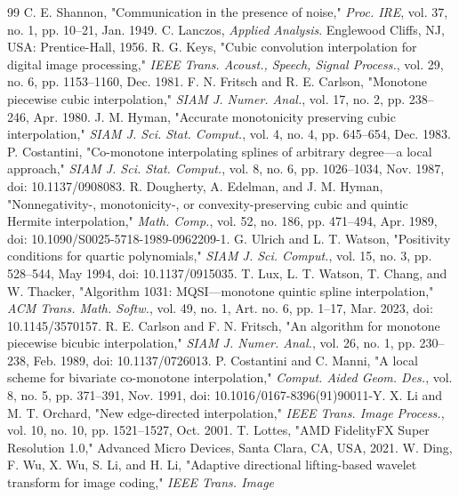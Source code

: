 \documentclass[journal]{IEEEtran}
\begin{document}
\begin{thebibliography}{99}
\scriptsize
{}
C. E. Shannon, "Communication in the presence of noise," \emph{Proc. IRE},
vol. 37, no. 1, pp. 10--21, Jan. 1949.
C. Lanczos, \emph{Applied Analysis}. Englewood Cliffs, NJ, USA:
Prentice-Hall, 1956.
R. G. Keys, "Cubic convolution interpolation for digital image
processing," \emph{IEEE Trans. Acoust., Speech, Signal Process.}, vol. 29,
no. 6, pp. 1153--1160, Dec. 1981.
F. N. Fritsch and R. E. Carlson, "Monotone piecewise cubic interpolation,"
\emph{SIAM J. Numer. Anal.}, vol. 17, no. 2, pp. 238--246, Apr. 1980.
J. M. Hyman, "Accurate monotonicity preserving cubic interpolation,"
\emph{SIAM J. Sci. Stat. Comput.}, vol. 4, no. 4, pp. 645--654, Dec. 1983.
P. Costantini, "Co-monotone interpolating splines of arbitrary degree---a
local approach," \emph{SIAM J. Sci. Stat. Comput.}, vol. 8, no. 6,
pp. 1026--1034, Nov. 1987, doi: 10.1137/0908083.
R. Dougherty, A. Edelman, and J. M. Hyman, "Nonnegativity-,
monotonicity-, or convexity-preserving cubic and quintic Hermite
interpolation," \emph{Math. Comp.}, vol. 52, no. 186, pp. 471--494,
Apr. 1989, doi: 10.1090/S0025-5718-1989-0962209-1.
G. Ulrich and L. T. Watson, "Positivity conditions for quartic
polynomials," \emph{SIAM J. Sci. Comput.}, vol. 15, no. 3, pp. 528--544,
May 1994, doi: 10.1137/0915035.
T. Lux, L. T. Watson, T. Chang, and W. Thacker, "Algorithm 1031:
MQSI---monotone quintic spline interpolation," \emph{ACM Trans. Math.
Softw.}, vol. 49, no. 1, Art. no. 6, pp. 1--17, Mar. 2023,
doi: 10.1145/3570157.
R. E. Carlson and F. N. Fritsch, "An algorithm for monotone piecewise
bicubic interpolation," \emph{SIAM J. Numer. Anal.}, vol. 26, no. 1,
pp. 230--238, Feb. 1989, doi: 10.1137/0726013.
P. Costantini and C. Manni, "A local scheme for bivariate co-monotone
interpolation," \emph{Comput. Aided Geom. Des.}, vol. 8, no. 5,
pp. 371--391, Nov. 1991, doi: 10.1016/0167-8396(91)90011-Y.
X. Li and M. T. Orchard, "New edge-directed interpolation," \emph{IEEE
Trans. Image Process.}, vol. 10, no. 10, pp. 1521--1527, Oct. 2001.
T. Lottes, "AMD FidelityFX Super Resolution 1.0," Advanced Micro Devices,
Santa Clara, CA, USA, 2021.
W. Ding, F. Wu, X. Wu, S. Li, and H. Li, "Adaptive directional
lifting-based wavelet transform for image coding," \emph{IEEE Trans. Image
}
\end{thebibliography}
\end{document}
